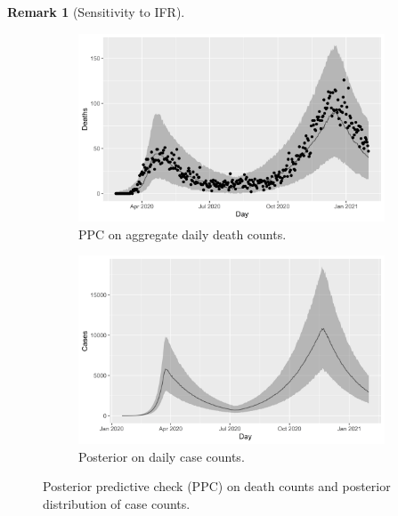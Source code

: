 \documentclass[11pt]{amsart}
\numberwithin{equation}{section}
\theoremstyle{plain}
\newtheorem{remark}{Remark}
\begin{document}
 \begin{remark}[Sensitivity to IFR]

 \end{remark}


  \begin{figure}
 \centering
 \begin{subfigure}{.5\textwidth}
  \centering
  \includegraphics[width=.9\linewidth]{../figs/deaths_ppc.png}
 \caption{PPC on aggregate daily death counts.}
 \label{fig:deathsppc}
 \end{subfigure}%
 \begin{subfigure}{.5\textwidth}
  \centering
  \includegraphics[width=.9\linewidth]{../figs/cases_ppc.png}
 \caption{Posterior on daily case counts.}
 \label{fig:casesppc}
 \end{subfigure}
 \caption{Posterior predictive check (PPC) on death counts and posterior distribution of case counts.}
 \label{fig:ppcs}
 \end{figure}
\end{document}

